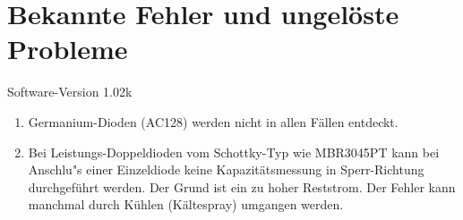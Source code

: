 
\chapter{Bekannte Fehler und ungel\"oste Probleme}
{\center Software-Version 1.02k}

\begin{enumerate}

\item Germanium-Dioden (AC128) werden nicht in allen F\"allen entdeckt.
\item Bei Leistungs-Doppeldioden vom Schottky-Typ wie MBR3045PT kann bei Anschlu"s einer Einzeldiode keine Kapazit\"atsmessung in Sperr-Richtung 
durchgef\"uhrt werden. Der Grund ist ein zu hoher Reststrom. Der Fehler kann manchmal durch K\"uhlen (K\"altespray) umgangen werden.

\end{enumerate}
